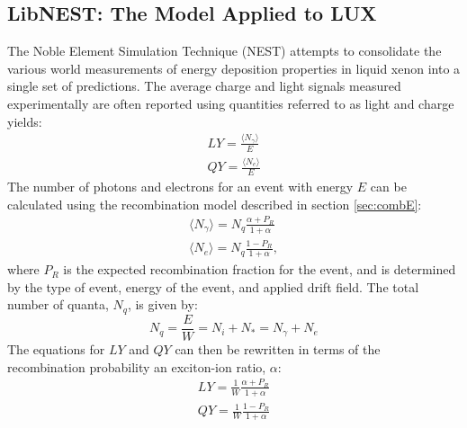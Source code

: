 \subsection{LibNEST: The Model Applied to LUX}\label{sec:libnest}
The Noble Element Simulation Technique (NEST) attempts to consolidate the various world measurements of energy deposition properties in liquid xenon into a single set of predictions\cite{nest1,nest2,lenardo}. The average charge and light signals measured experimentally are often reported using quantities referred to as light and charge yields:
\begin{equation}
\begin{split}
LY=\frac{\langle N_{\gamma}\rangle}{E}\\[1em]
QY=\frac{\langle N_e\rangle}{E}
\end{split}
\end{equation}
The number of photons and electrons for an event with energy $E$ can be calculated using the recombination model described in section \ref{sec:combE}:
\begin{equation}
\begin{split}
\langle N_{\gamma} \rangle=N_q\frac{\alpha +P_R}{1+\alpha}\\[1em]
\langle N_{e} \rangle=N_q\frac{1-P_R}{1+\alpha},
\end{split}
\end{equation}
where $P_R$ is the expected recombination fraction for the event, and is determined by the type of event, energy of the event, and applied drift field. The total number of quanta, $N_q$, is given by:
\begin{equation}
N_q=\frac{E}{W}=N_{i}+N_{*}=N_{\gamma}+N_{e}
\end{equation}
The equations for $LY$ and $QY$ can then be rewritten in terms of the recombination probability an exciton-ion ratio, $\alpha$:
\begin{equation}
\begin{split}
LY=\frac{1}{W}\frac{\alpha +P_R}{1+\alpha}\\[1em]
QY=\frac{1}{W}\frac{1-P_R}{1+\alpha}
\end{split}
\end{equation}

